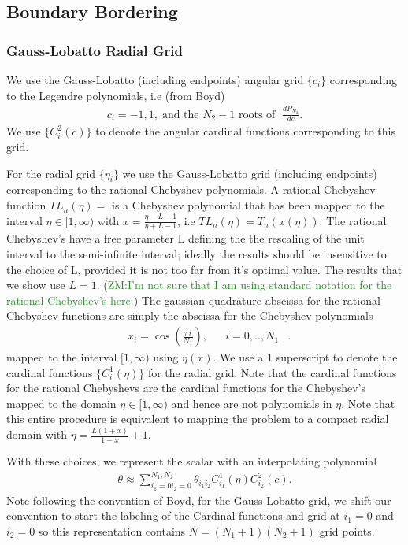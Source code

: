 \documentclass[aps,prd,amsmath,showpacs,amssymb,superscriptaddress,nofootinbib,longbibliography,eqsecnum,preprintnumbers]{revtex4-1}
\newcommand{\zach}[1]{\textcolor{ForestGreen}{#1}}
\begin{document}
\subsection{Boundary Bordering}

\subsubsection{Gauss-Lobatto Radial Grid}
We use the Gauss-Lobatto (including endpoints) angular grid $\{c_i\}$ corresponding to the Legendre polynomials, i.e (from Boyd)
\begin{align}
c_i = -1, 1, \; \text{and the $N_2-1$ roots of }\; \frac{dP_{N_2}}{dc}.
\end{align}
We use $\{C^2_i(c)\}$ to denote the angular cardinal functions corresponding to this grid.

For the radial grid $\{\eta_i\}$ we use the Gauss-Lobatto grid (including endpoints) corresponding to the rational Chebyshev polynomials. A rational Chebyshev function $TL_n(\eta)=$ is a Chebyshev polynomial that has been mapped to the interval $\eta \in[1,\infty)$ with $x=\frac{\eta -L-1}{\eta+L-1}$, i.e $TL_n(\eta)=T_n(x(\eta))$. The rational Chebyshev's have a free parameter L defining the the rescaling of the unit interval to the semi-infinite interval; ideally the results should be insensitive to the choice of L, provided it is not too far from it's optimal value. The results that we show use $L=1$.
(\zach{ZM:I'm not sure that I am using standard notation for the rational Chebyshev's here.}) The gaussian quadrature abscissa for the rational Chebyshev functions are simply the abscissa for the Chebyshev polynomials
\begin{align}
&x_i=\cos\left(\frac{\pi i}{N_1}\right),& &i=0,..,N_1&.
\end{align} mapped to the interval $[1,\infty)$ using $\eta(x)$.
We use a 1 superscript to denote the cardinal functions $\{C_i^1(\eta)\}$ for the radial grid. Note that the cardinal functions for the rational Chebyshevs are the cardinal functions for the Chebyshev's mapped to the domain $\eta \in [1,\infty)$ and hence are not polynomials in $\eta$.
Note that this entire procedure is equivalent to mapping the problem to a compact radial domain with $\eta =\frac{L(1+x)}{1-x}+1$.

With these choices, we represent the scalar with an interpolating polynomial
\begin{align}
\theta \approx \sum_{i_1=0 i_2=0}^{N_1, N_2}\theta_{i_1 i_2}C^1_{i_1}(\eta)C^2_{i_2}(c).
\end{align}
Note following the convention of Boyd\cite{Boyd99chebyshevand}, for the Gauss-Lobatto grid, we shift our convention to start the labeling of the Cardinal functions and grid at $i_1=0$ and $i_2=0$ so this representation contains $N=(N_1+1)(N_2+1)$ grid points.
\end{document}
